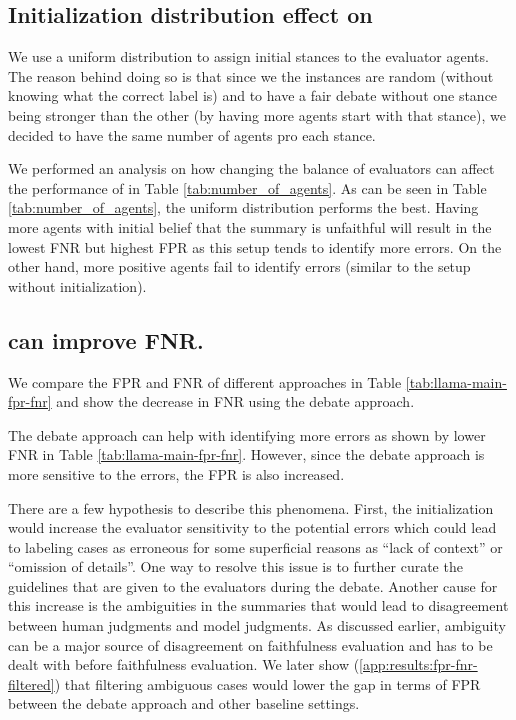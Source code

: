 \subsection{Initialization distribution effect on \method }\label{app:init}
We use a uniform distribution to assign initial stances to the evaluator agents. 
The reason behind doing so is that
since we the instances are random (without knowing what the correct label is) and to have a fair debate without one stance being stronger than the other (by having more agents start with that stance), we decided to have the same number of agents pro each stance.

We performed an analysis on how changing the balance of evaluators can affect the performance of \method in Table \ref{tab:number_of_agents}. 
As can be seen in Table \ref{tab:number_of_agents}, the uniform distribution performs the best. Having more agents with initial belief that the summary is unfaithful will result in the lowest FNR but highest FPR as this setup tends to identify more errors. On the other hand, more positive agents fail to identify errors (similar to the setup without initialization). 


\subsection{\method can improve FNR.}\label{app:results:fpr-fnr}
We compare the FPR and FNR of different approaches in Table \ref{tab:llama-main-fpr-fnr} and show the decrease in FNR using the debate approach.

The debate approach can help with identifying more errors as shown by lower FNR in Table \ref{tab:llama-main-fpr-fnr}.  
However, since the debate approach is more sensitive to the errors, the FPR is also increased. 

There are a few hypothesis to describe this phenomena. First, the initialization would increase the evaluator sensitivity to the potential errors which could lead to labeling cases as erroneous for some superficial reasons as ``lack of context'' or ``omission of details''. One way to resolve this issue is to further curate the guidelines that are given to the evaluators during the debate.
Another cause for this increase is the ambiguities in the summaries that would lead to disagreement between human judgments and model judgments. As discussed earlier, ambiguity can be a major source of disagreement on faithfulness evaluation and has to be dealt with before faithfulness evaluation.  
We later show (\ref{app:results:fpr-fnr-filtered}) that filtering ambiguous cases would lower the gap in terms of FPR between the debate approach and other baseline settings.

